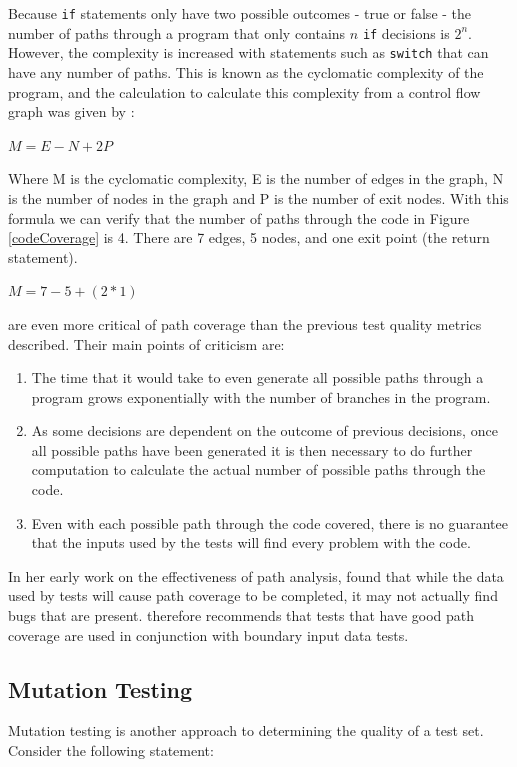 Because \verb+if+ statements only have two possible outcomes - true or false - the number of paths through a program that only contains $n$ \verb+if+ decisions is $2^n$. However, the complexity is increased with statements such as \verb+switch+ that can have any number of paths. This is known as the cyclomatic complexity of the program, and the calculation to calculate this complexity from a control flow graph was given by \citet{1702388}:

$M = E - N + 2P$

Where M is the cyclomatic complexity, E is the number of edges in the graph, N is the number of nodes in the graph and P is the number of exit nodes. With this formula we can verify that the number of paths through the code in Figure \ref{codeCoverage} is 4. There are 7 edges, 5 nodes, and one exit point (the return statement).

$M = 7 - 5 + (2*1)$

\citet{Myers:2004:AST:983238} are even more critical of path coverage than the previous test quality metrics described. Their main points of criticism are:

\begin{enumerate}
\item The time that it would take to even generate all possible paths through a program grows exponentially with the number of branches in the program.
\item As some decisions are dependent on the outcome of previous decisions, once all possible paths have been generated it is then necessary to do further computation to calculate the actual number of possible paths through the code.
\item Even with each possible path through the code covered, there is no guarantee that the inputs used by the tests will find every problem with the code.
\end{enumerate}

In her early work on the effectiveness of path analysis, \citet{1658851} found that while the data used by tests will cause path coverage to be completed, it may not actually find bugs that are present.  therefore recommends that tests that have good path coverage are used in conjunction with boundary input data tests.

\subsection{Mutation Testing}

Mutation testing is another approach to determining the quality of a test set. Consider the following statement:

